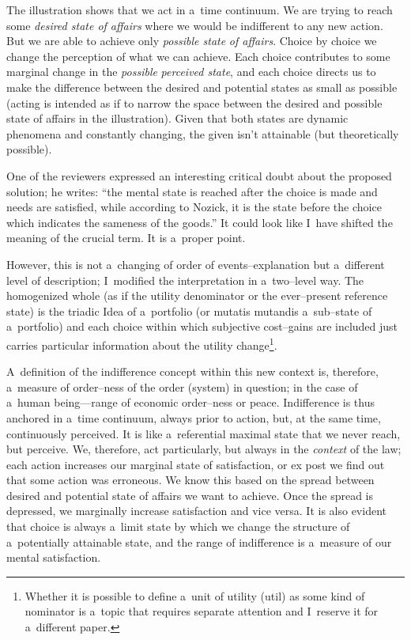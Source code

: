 The illustration shows that we act in a~time continuum. We are trying to reach some \textit{desired state of affairs} where we would be indifferent to any new action. But we are able to achieve only \textit{possible state} \textit{of affairs}. Choice by choice we change the perception of what we can achieve. Each choice contributes to some marginal change in the \textit{possible} \textit{perceived state}, and each choice directs us to make the difference between the desired and potential states as small as possible (acting is intended as if to narrow the space between the desired and possible state of affairs in the illustration). Given that both states are dynamic phenomena and constantly changing, the given isn't attainable (but theoretically possible).



One of the reviewers expressed an interesting critical doubt about the proposed solution; he writes: ``the mental state is reached after the choice is made and needs are satisfied, while according to Nozick, it is the state before the choice which indicates the sameness of the goods.'' It could look like I~have shifted the meaning of the crucial term. It is a~proper point.



However, this is not a~changing of order of events–explanation but a~different level of description; I~modified the interpretation in a~two–level way. The homogenized whole (as if the utility denominator or the ever–present reference state) is the triadic Idea of a~portfolio (or mutatis mutandis a~sub–state of a~portfolio) and each choice within which subjective cost–gains are included just carries particular information about the utility change\footnote{Whether it is possible to define a~unit of utility (util) as some kind of nominator is a~topic that requires separate attention and I~reserve it for a~different paper. }.



A~definition of the indifference concept within this new context is, therefore, a~measure of order–ness of the order (system) in question; in the case of a~human being---range of economic order–ness or peace. Indifference is thus anchored in a~time continuum, always prior to action, but, at the same time, continuously perceived. It is like a~referential maximal state that we never reach, but perceive. We, therefore, act particularly, but always in the \textit{context} of the law; each action increases our marginal state of satisfaction, or ex post we find out that some action was erroneous. We know this based on the spread between desired and potential state of affairs we want to achieve. Once the spread is depressed, we marginally increase satisfaction and vice versa. It is also evident that choice is always a~limit state by which we change the structure of a~potentially attainable state, and the range of indifference is a~measure of our mental satisfaction.



